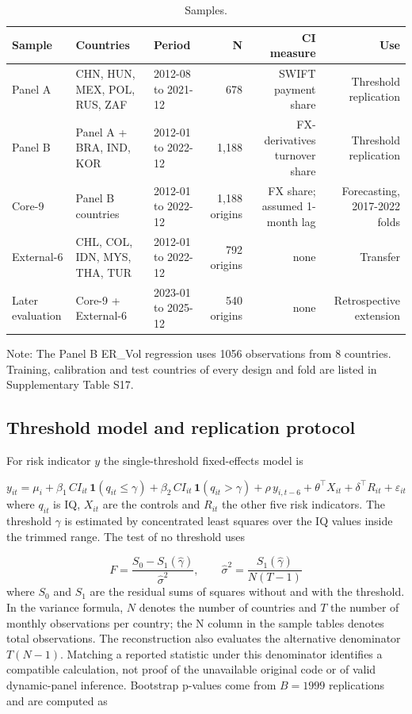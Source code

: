 \documentclass[preprint,12pt,authoryear]{elsarticle}
\begin{document}
\begin{table}[!htbp]
\centering
\scriptsize
\setlength{\tabcolsep}{3pt}
\caption{Samples.}
\label{tab:data}
\begin{tabular}{lllrrr}
\toprule
Sample & Countries & Period & N & CI measure & Use \\
\midrule
Panel A & CHN, HUN, MEX, POL, RUS, ZAF & 2012-08 to 2021-12 & 678 & SWIFT payment share & Threshold replication \\
Panel B & Panel A + BRA, IND, KOR & 2012-01 to 2022-12 & 1,188 & FX-derivatives turnover share & Threshold replication \\
Core-9 & Panel B countries & 2012-01 to 2022-12 & 1,188 origins & FX share; assumed 1-month lag & Forecasting, 2017-2022 folds \\
External-6 & CHL, COL, IDN, MYS, THA, TUR & 2012-01 to 2022-12 & 792 origins & none & Transfer \\
Later evaluation & Core-9 + External-6 & 2023-01 to 2025-12 & 540 origins & none & Retrospective extension \\
\bottomrule
\end{tabular}
\par\vspace{2pt}\parbox{0.95\linewidth}{\scriptsize Note: The Panel B ER\_Vol regression uses 1056 observations from 8 countries. Training, calibration and test countries of every design and fold are listed in Supplementary Table S17.}
\end{table}
\subsection{Threshold model and replication protocol}
For risk indicator $y$ the single-threshold fixed-effects model is

\begin{equation}\label{eq:thr}
y_{it} = \mu_i + \beta_1\, CI_{it}\, \mathbf{1}(q_{it} \le \gamma) + \beta_2\, CI_{it}\, \mathbf{1}(q_{it} > \gamma) + \rho\, y_{i,t-6} + \theta^{\top} X_{it} + \delta^{\top} R_{it} + \varepsilon_{it}
\end{equation}
where $q_{it}$ is IQ, $X_{it}$ are the controls and $R_{it}$ the other five risk indicators. The threshold $\gamma$ is estimated by concentrated least squares over the IQ values inside the trimmed range. The test of no threshold uses

\begin{equation}\label{eq:F}
F = \frac{S_0 - S_1(\hat\gamma)}{\hat\sigma^2}, \qquad \hat\sigma^2 = \frac{S_1(\hat\gamma)}{N(T-1)}
\end{equation}
where $S_0$ and $S_1$ are the residual sums of squares without and with the threshold. In the variance formula, $N$ denotes the number of countries and $T$ the number of monthly observations per country; the N column in the sample tables denotes total observations. The reconstruction also evaluates the alternative denominator $T(N-1)$. Matching a reported statistic under this denominator identifies a compatible calculation, not proof of the unavailable original code or of valid dynamic-panel inference. Bootstrap p-values come from $B = 1999$ replications and are computed as
\end{document}
